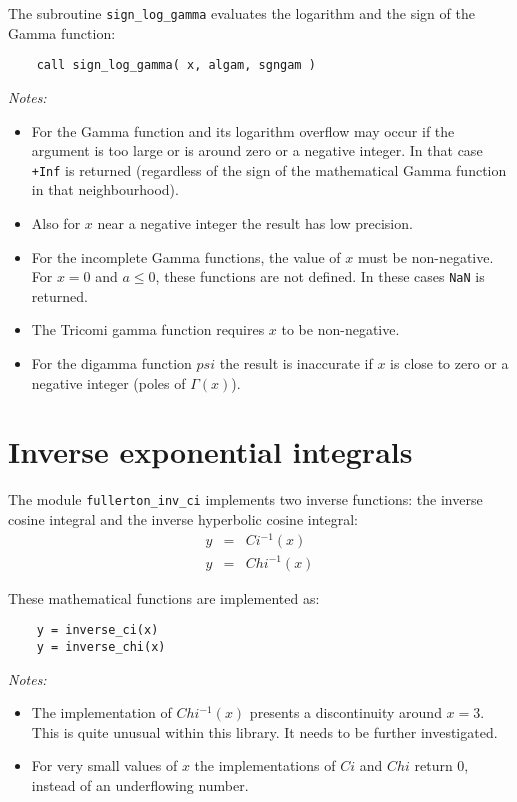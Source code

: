 \documentclass{article}
\begin{document}
The subroutine \verb+sign_log_gamma+ evaluates the logarithm and the sign of the Gamma function:
\begin{verbatim}
    call sign_log_gamma( x, algam, sgngam )
\end{verbatim}

\emph{Notes:}
\begin{itemize}
\item
For the Gamma function and its logarithm overflow may occur if the argument is too large or is around zero or a negative integer.
In that case \verb~+Inf~ is returned (regardless of the sign of the mathematical Gamma function in that neighbourhood).
\item
Also for $x$ near a negative integer the result has low precision.
\item
For the incomplete Gamma functions, the value of $x$ must be non-negative. For $x = 0$ and $a \leq 0$, these functions are
not defined. In these cases \verb+NaN+ is returned.
\item
The Tricomi gamma function requires $x$ to be non-negative.
\item
For the digamma function $psi$ the result is inaccurate if $x$ is close to zero or a negative integer (poles of $\Gamma(x)$).
\end{itemize}


\section{Inverse exponential integrals}
The module \verb+fullerton_inv_ci+ implements two inverse functions: the inverse cosine integral
and the inverse hyperbolic cosine integral:
\begin{eqnarray}
    y &=& Ci^{-1}(x) \\
    y &=& Chi^{-1}(x)
\end{eqnarray}

These mathematical functions are implemented as:
\begin{verbatim}
    y = inverse_ci(x)
    y = inverse_chi(x)
\end{verbatim}

\emph{Notes:}
\begin{itemize}
\item
The implementation of $Chi^{-1}(x)$ presents a discontinuity around $x = 3$. This is
quite unusual within this library. It needs to be further investigated.
\item
For very small values of $x$ the implementations of $Ci$ and $Chi$ return 0, instead of an underflowing number.
\end{itemize}
\end{document}
